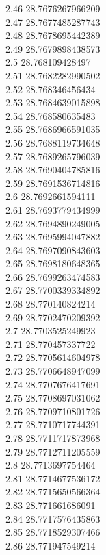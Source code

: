 {2.46	28.7676267966209\\
2.47	28.7677485287743\\
2.48	28.7678695442389\\
2.49	28.7679898438573\\
2.5	28.768109428497\\
2.51	28.7682282990502\\
2.52	28.768346456434\\
2.53	28.7684639015898\\
2.54	28.768580635483\\
2.55	28.7686966591035\\
2.56	28.7688119734648\\
2.57	28.7689265796039\\
2.58	28.7690404785816\\
2.59	28.7691536714816\\
2.6	28.7692661594111\\
2.61	28.7693779434999\\
2.62	28.7694890249005\\
2.63	28.7695994047882\\
2.64	28.7697090843603\\
2.65	28.7698180648365\\
2.66	28.7699263474583\\
2.67	28.7700339334892\\
2.68	28.770140824214\\
2.69	28.7702470209392\\
2.7	28.7703525249923\\
2.71	28.770457337722\\
2.72	28.7705614604978\\
2.73	28.7706648947099\\
2.74	28.7707676417691\\
2.75	28.7708697031062\\
2.76	28.7709710801726\\
2.77	28.7710717744391\\
2.78	28.7711717873968\\
2.79	28.7712711205559\\
2.8	28.7713697754464\\
2.81	28.7714677536172\\
2.82	28.7715650566364\\
2.83	28.771661686091\\
2.84	28.7717576435863\\
2.85	28.7718529307466\\
2.86	28.771947549214\\
}
